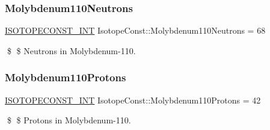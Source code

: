 \subsubsection{\texorpdfstring{Molybdenum110\+Neutrons}{Molybdenum110Neutrons}}
{\footnotesize\ttfamily \mbox{\hyperlink{group___isotope_const-_macros_ga5f18360b3e99483a35c32d789e62621c}{I\+S\+O\+T\+O\+P\+E\+C\+O\+N\+S\+T\+\_\+\+I\+NT}} Isotope\+Const\+::\+Molybdenum110\+Neutrons = 68}

\$ \$ Neutrons in Molybdenum-\/110. \mbox{\label{group___isotope_const-_molybdenum-_mo110_ga838af28d03b7ef34dcd3b94bc61e59c3}} 
\subsubsection{\texorpdfstring{Molybdenum110\+Protons}{Molybdenum110Protons}}
{\footnotesize\ttfamily \mbox{\hyperlink{group___isotope_const-_macros_ga5f18360b3e99483a35c32d789e62621c}{I\+S\+O\+T\+O\+P\+E\+C\+O\+N\+S\+T\+\_\+\+I\+NT}} Isotope\+Const\+::\+Molybdenum110\+Protons = 42}

\$ \$ Protons in Molybdenum-\/110. 